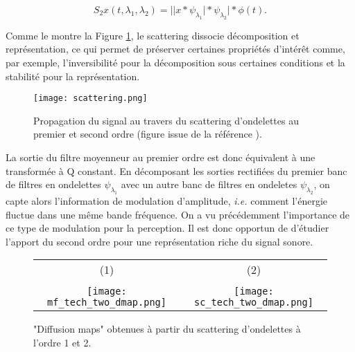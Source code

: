 \begin{equation}
S_2{x}(t, \lambda_1, \lambda_2)
= \vert \vert {x} \ast {\psi_{\lambda_1}} \vert \ast {\psi_{\lambda_2}} \vert \ast \phi(t)\mbox{.}
\end{equation}

Comme le montre la Figure \ref{fig:scat}, le scattering dissocie décomposition et représentation, ce qui permet de préserver certaines propriétés d'intérêt comme, par exemple, l'inversibilité pour la décomposition sous certaines conditions et la stabilité pour la représentation.

\begin{figure}[t]
  \texttt{[image: scattering.png]}
  \caption{Propagation du signal au travers du scattering d'ondelettes au premier et second ordre (figure issue de la référence ).}
  \label{fig:scat}
\end{figure}

La sortie du filtre moyenneur au premier ordre est donc équivalent à une transformée à Q constant. En décomposant les sorties rectifiées du premier banc de filtres en ondelettes $\psi_{\lambda_1}$ avec un autre banc de filtres en ondeletes $\psi_{\lambda_2}$, on capte alors l'information de modulation d'amplitude, \textit{i.e.} comment l'énergie fluctue dans une même bande fréquence. On a vu précédemment l'importance de ce type de modulation pour la perception. Il est donc opportun de d'étudier l'apport du second ordre pour une représentation riche du signal sonore.  %


\begin{figure*}[t]
  \begin{tabular}{cc}
    (1)  &   (2)\\ \\
      \texttt{[image: mf\_tech\_two\_dmap.png]} &
      \texttt{[image: sc\_tech\_two\_dmap.png]}
  \end{tabular}
  \begin{center}
  \end{center}
  \label{fig:dm}
  \caption{"Diffusion maps" obtenues à partir du scattering d'ondelettes à l'ordre 1 et 2.}
\end{figure*}


